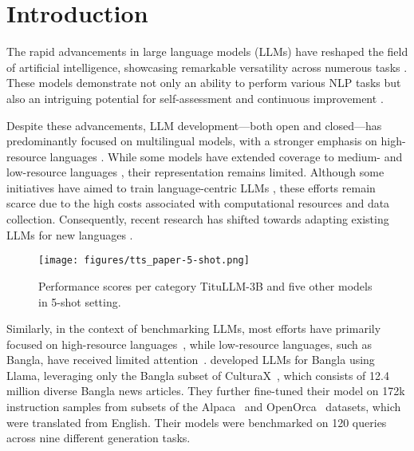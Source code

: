 \section{Introduction}
\label{sec:introduction}


The rapid advancements in large language models (LLMs) have reshaped the field of artificial intelligence, showcasing remarkable versatility across numerous tasks \cite{brown2020language,ouyang2022training,achiam2023gpt4,chowdhery2023palm}. These models demonstrate not only an ability to perform various NLP tasks but also an intriguing potential for self-assessment and continuous improvement \cite{liu2023gpteval,fu2023chain,chiang2023vicuna}. 

Despite these advancements, LLM development—both open and closed—has predominantly focused on multilingual models, with a stronger emphasis on high-resource languages \cite{achiam2023gpt4,touvron2023llama}. While some models have extended coverage to medium- and low-resource languages \cite{le2023bloom,ustun2024aya,qwen2,gemma_2024}, their representation remains limited. Although some initiatives have aimed to train language-centric LLMs \cite{sengupta2023jais,fanar2024}, these efforts remain scarce due to the high costs associated with computational resources and data collection. Consequently, recent research has shifted towards adapting existing LLMs for new languages \cite{levine2024rakutenai,fanar2024}.

\begin{figure}[t]
  \centering
\texttt{[image: figures/tts\_paper-5-shot.png]}
  \caption{Performance scores per category TituLLM-3B and five other  models in 5-shot setting.}
  \vspace{-0.3cm}
  \label{fig:bangla_eval_data}
  \vspace{-0.3cm}
\end{figure}

Similarly, in the context of benchmarking LLMs, most efforts have primarily focused on high-resource languages~\cite{bang2023multitask, ahuja2023mega}, while low-resource languages, such as Bangla, have received limited attention~\cite{kabir2024benllm, zehady2024bongllama, bhattacharjee2023banglanlg}. \citet{zehady2024bongllama} developed LLMs for Bangla using Llama, leveraging only the Bangla subset of CulturaX~\cite{nguyen2024culturax}, which consists of 12.4 million diverse Bangla news articles. They further fine-tuned their model on 172k instruction samples from subsets of the Alpaca~\cite{taori2023stanford} and OpenOrca~\cite{lian2023openorca} datasets, which were translated from English. Their models were benchmarked on 120 queries across nine different generation tasks.

